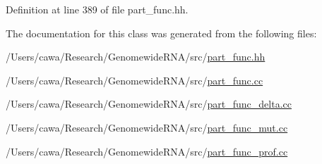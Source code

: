 Definition at line 389 of file part\+\_\+func.\+hh.



The documentation for this class was generated from the following files\+:\begin{DoxyCompactItemize}
\item 
/\+Users/cawa/\+Research/\+Genomewide\+R\+N\+A/src/\hyperlink{part__func_8hh}{part\+\_\+func.\+hh}\item 
/\+Users/cawa/\+Research/\+Genomewide\+R\+N\+A/src/\hyperlink{part__func_8cc}{part\+\_\+func.\+cc}\item 
/\+Users/cawa/\+Research/\+Genomewide\+R\+N\+A/src/\hyperlink{part__func__delta_8cc}{part\+\_\+func\+\_\+delta.\+cc}\item 
/\+Users/cawa/\+Research/\+Genomewide\+R\+N\+A/src/\hyperlink{part__func__mut_8cc}{part\+\_\+func\+\_\+mut.\+cc}\item 
/\+Users/cawa/\+Research/\+Genomewide\+R\+N\+A/src/\hyperlink{part__func__prof_8cc}{part\+\_\+func\+\_\+prof.\+cc}\end{DoxyCompactItemize}
